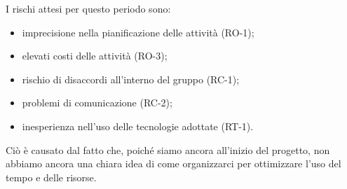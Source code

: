 I rischi attesi per questo periodo sono:
\begin{itemize}
	\item imprecisione nella pianificazione delle attività (RO-1);
	\item elevati costi delle attività (RO-3);
	\item rischio di disaccordi all'interno del gruppo (RC-1);
	\item problemi di comunicazione (RC-2);
	\item inesperienza nell'uso delle tecnologie adottate (RT-1).
\end{itemize}
Ciò è causato dal fatto che, poiché siamo ancora all'inizio del progetto, non abbiamo ancora una chiara idea di come organizzarci per ottimizzare l'uso del tempo e delle risorse.

